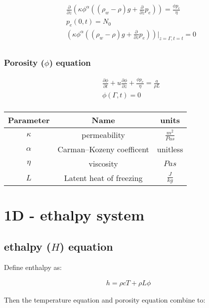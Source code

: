\documentclass[a4paper,12pt]{article}
\newcommand{\pd}[2]{\frac{\partial #1}{\partial #2}}
\begin{document}
\begin{align}
  &\pd{}{z}\left(\kappa\phi^\alpha\left((\rho_w - \rho)g + \pd{}{z}p_e\right)\right) = \frac{\phi p_e}{\eta} \label{eq:pe-equation}\\
  &p_e(0,t) = N_0\\
  &\left(\kappa \phi^\alpha\left( (\rho_w - \rho)g + \pd{}{z} p_e\right)\right)\bigg\rvert_{z=\Gamma, t=t} = 0\\
\end{align}

\subsubsection{Porosity ($\phi$) equation}

\begin{align}
  &\pd{\phi}{t} + u\pd{\phi}{z} + \frac{\phi p_e}{\eta} = \frac{a}{\rho L}\\
  &\phi(\Gamma, t) = 0\\
\end{align}


\begin{center}
\begin{tabular}{ |c|c|c| } 
 \hline
  Parameter & Name & units\\
  \hline
  $\kappa$ & permeability & $\frac{m^2}{Pa s}$\\
  $\alpha$ & Carman–Kozeny coefficent & unitless\\
  $\eta$ & viscosity & $Pa s$\\
  $L$ & Latent heat of freezing & $\frac{J}{kg}$\\
  \hline
\end{tabular}
\end{center}

\section{1D - ethalpy system}

\subsection{ethalpy ($H$) equation}

Define enthalpy as:

\begin{align*}
  h = \rho c T + \rho L \phi
\end{align*}

Then the temperature equation and porosity equation combine to:
\end{document}
